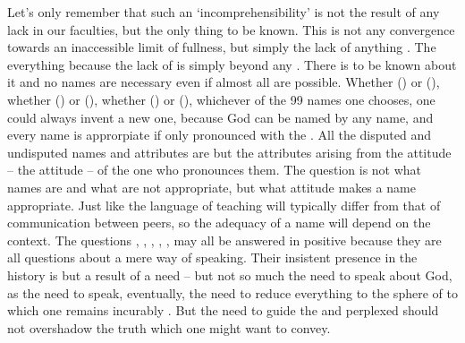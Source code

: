 {  Let's only remember that such an `incomprehensibility' is not the result of
  any lack in our faculties, but the only thing to be known.  This
   is not any convergence towards an inaccessible limit of
  fullness, but simply the lack of anything . The 
   everything because the lack of  is simply
  beyond any .  There is  to be known about it and
  no names are necessary even if almost all are possible.  Whether 
  () or  (), whether 
  () or  (), whether  ()
  or  (), whichever of the 99 names one chooses, one
  could always invent a new one, because God can be named by any name, and every
  name is approrpiate if only pronounced with the .  All the
  disputed and undisputed names and attributes are but the attributes arising
  from the attitude -- the  attitude -- of the one who pronounces
  them.  The question is not what names are and what are not appropriate, but
  what attitude makes a name appropriate.  Just like the
  language of teaching will typically differ from that of communication between
  peers, so the adequacy of a name will depend on the context.
%
  The questions , , , , ,  may all be answered in
  positive because they are all questions about a mere way of speaking.  Their
  insistent presence in the history is but a result of a need -- but not so much
  the need to speak about God, as the need to speak, eventually, the need to
  reduce everything to the sphere of  to which one remains
  incurably . But the need to guide the  and perplexed
  should not overshadow the truth which one might want to convey.

}%


